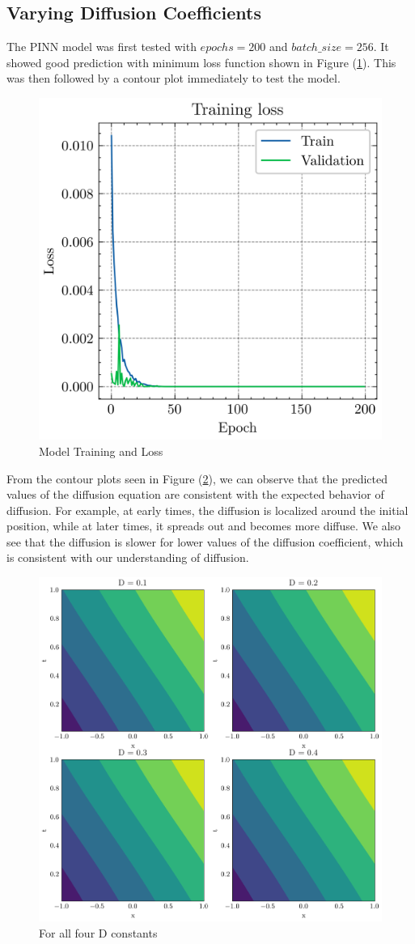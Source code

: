\subsection{Varying Diffusion Coefficients}
The PINN model was first tested with $epochs=200$ and $batch\_size=256$. It showed good prediction with minimum loss function shown in Figure (\ref{fig:tls}). This was then followed by a contour plot immediately to test the model.

\begin{figure}[htb!]
\includegraphics[width=.49\textwidth]{images/train_loss.png}
\vspace*{-8mm}
\caption{Model Training and Loss}
\label{fig:tls}
\end{figure}

From the contour plots seen in Figure (\ref{fig:alld}), we can observe that the predicted values of the diffusion equation are consistent with the expected behavior of diffusion. For example, at early times, the diffusion is localized around the initial position, while at later times, it spreads out and becomes more diffuse. We also see that the diffusion is slower for lower values of the diffusion coefficient, which is consistent with our understanding of diffusion.

\begin{figure}[htb!]
\begin{center}
\includegraphics[width=.49\textwidth]{images/all.png}
\vspace*{-8mm}
\caption{For all four D constants}
\label{fig:alld}
\end{center}
\end{figure}

